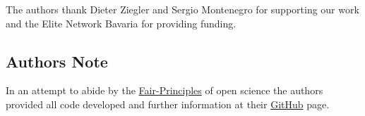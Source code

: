\documentclass[graybox]{svmono}
\newcommand{\1}{\mathbbm{1}}                 %
\begin{document}
\begin{acknowledgement}
The authors thank Dieter Ziegler and Sergio Montenegro for supporting our work and the Elite Network Bavaria for providing funding. 

\subsection*{Authors Note}
In an attempt to abide by the \href{https://www.go-fair.org/fair-principles}{Fair-Principles} of open science the authors provided all code developed and further information at their \href{https://github.com/fallow24/L.U.N.A}{GitHub} page.
\end{acknowledgement}



\end{document}
